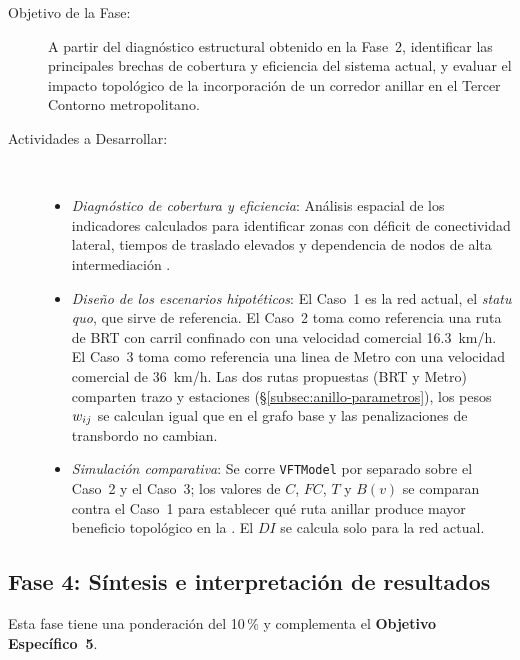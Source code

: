 \begin{description}
    \item[Objetivo de la Fase:] A partir del diagnóstico estructural obtenido en
    la Fase~2, identificar las principales brechas de cobertura y eficiencia del
    sistema actual, y evaluar el impacto topológico de la incorporación de un
    corredor anillar en el Tercer Contorno metropolitano.

    \item[Actividades a
    Desarrollar:]~\begin{itemize}
\item \textit{Diagnóstico de cobertura y eficiencia}: Análisis espacial de
los indicadores calculados para identificar zonas con déficit de conectividad
        lateral, tiempos de traslado elevados y dependencia de nodos de alta
        intermediación \citep{mishra2015, ugur2025}.
\item \textit{Diseño de los escenarios hipotéticos}: El Caso~1 es la red
        actual, el \textit{statu quo}, que sirve de referencia.
        El Caso~2 toma como referencia una ruta 
        de BRT
         con carril
        confinado con una velocidad comercial 
         16.3~km/h. 
         El Caso~3 toma como referencia una linea de Metro con 
         una velocidad comercial de
        36~km/h. Las dos rutas propuestas (BRT y Metro) comparten trazo y estaciones
        (§\ref{subsec:anillo-parametros}), los pesos $w_{ij}$ se
        calculan igual que en el grafo base y las penalizaciones de
        transbordo no cambian.
\item \textit{Simulación comparativa}: Se corre \texttt{VFTModel} por
        separado sobre el Caso~2 y el Caso~3; los valores de $C$, $FC$, $T$ y
        $B(v)$ se comparan contra el Caso~1 para establecer qué
        ruta anillar produce mayor beneficio topológico en la
        \zmvm{} \citep{cabrera2026VFTModel}. El $DI$ se calcula solo para la
        red actual.
    \end{itemize}
\end{description}

\subsection{Fase 4: Síntesis e interpretación de resultados}
\label{subsec:fase4}

Esta fase tiene una ponderación del 10\,\% y complementa el
\textbf{Objetivo Específico~5}.

